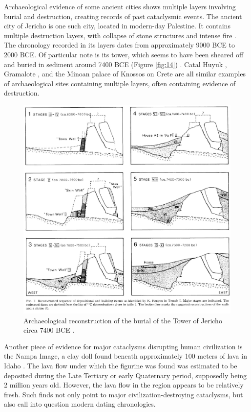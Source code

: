 \documentclass[10pt,twocolumn,letterpaper]{article}
\begin{document}
Archaeological evidence of some ancient cities shows multiple layers involving burial and destruction, creating records of past cataclysmic events. The ancient city of Jericho is one such city, located in modern-day Palestine. It contains multiple destruction layers, with collapse of stone structures and intense fire \cite{96,97}. The chronology recorded in its layers dates from approximately 9000 BCE to 2000 BCE. Of particular note is its tower, which seems to have been sheared off and buried in sediment around 7400 BCE (Figure \ref{fig:14}) \cite{95}. Catal Huyuk \cite{99}, Gramalote \cite{98}, and the Minoan palace of Knossos on Crete \cite{100,101} are all similar examples of archaeological sites containing multiple layers, often containing evidence of destruction.

\begin{figure}[t]
\begin{center}
   \includegraphics[width=1\linewidth]{jericho.jpg}
\end{center}
   \caption{Archaeological reconstruction of the burial of the Tower of Jericho circa 7400 BCE \cite{95}.}
\label{fig:14}
\label{fig:onecol}
\end{figure}

Another piece of evidence for major cataclysms disrupting human civilization is the Nampa Image, a clay doll found beneath approximately 100 meters of lava in Idaho \cite{102,103}. The lava flow under which the figurine was found was estimated to be deposited during the Late Tertiary or early Quaternary period, supposedly being 2 million years old. However, the lava flow in the region appears to be relatively fresh. Such finds not only point to major civilization-destroying cataclysms, but also call into question modern dating chronologies.
\end{document}
